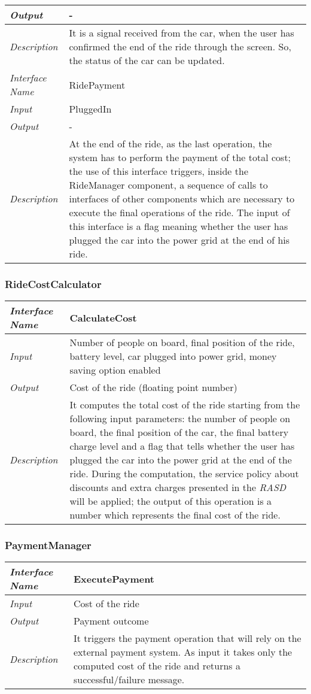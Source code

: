 \documentclass[11pt,a4paper]{report}
\begin{document}
\begin{tabularx}{\textwidth}{|>{\em}l|X|}
	\hline
	Output & -\\
	\hline
	Description &It is a signal received from the car, when the user has confirmed the end of the ride through the screen. So, the status of the car can be updated.\\
	\hline
	\hline
	Interface Name& RidePayment\\
	\hline
	Input &PluggedIn\\
	\hline
	Output & -\\
	\hline
	Description &At the end of the ride, as the last operation, the system has to perform the payment of the total cost; the use of this interface triggers, inside the RideManager component, a sequence of calls to interfaces of other components which are necessary to execute the final operations of the ride. The input of this interface is a flag meaning whether the user has plugged the car into the power grid at the end of his ride. \\
	\hline
\end{tabularx}
\subsubsection{RideCostCalculator}
\begin{tabularx}{\textwidth}{|>{\em}l|X|}
	\hline
	Interface Name& CalculateCost\\
	\hline
	Input & Number of people on board, final position of the ride, battery level, car plugged into power grid, money saving option enabled\\
	\hline
	Output & Cost of the ride (floating point number)\\
	\hline
	Description &It computes the total cost of the ride starting from the following input parameters: the number of people on board, the final position of the car, the final battery charge level and a flag that tells whether the user has plugged the car into the power grid at the end of the ride. During the computation, the service policy about discounts and extra charges presented in the \textit{RASD} will be applied; the output of this operation is a number which represents the final cost of the ride.\\
	\hline
\end{tabularx}

\subsubsection{PaymentManager}
\begin{tabularx}{\textwidth}{|>{\em}l|X|}
	\hline
	Interface Name& ExecutePayment\\
	\hline
	Input & Cost of the ride\\
	\hline
	Output & Payment outcome\\
	\hline
	Description &It triggers the payment operation that will rely on the external payment system. As input it takes only the computed cost of the ride and returns a successful/failure message.\\
	\hline
\end{tabularx}
\end{document}
